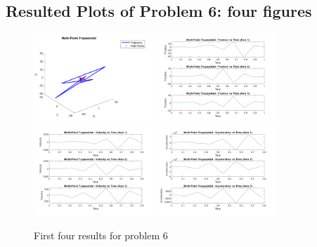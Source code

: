 \documentclass[conference]{IEEEtran}
\begin{document}
\subsection{Resulted Plots of Problem 6: four figures}
\begin{figure}[htbp]
    \centering
    \includegraphics[width=0.4\textwidth]{figures/prob6/fig_1.png}
    \includegraphics[width=0.4\textwidth]{figures/prob6/fig_2.png}
    \includegraphics[width=0.4\textwidth]{figures/prob6/fig_3.png}
    \includegraphics[width=0.4\textwidth]{figures/prob6/fig_4.png}
    \caption{First four results for problem 6}
    \label{fig:res7}
\end{figure}
\end{document}
